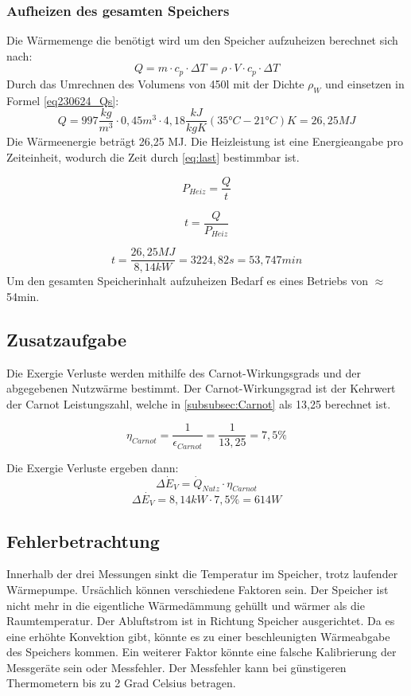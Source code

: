 \subsubsection{Aufheizen des gesamten Speichers}
Die Wärmemenge die benötigt wird um den Speicher aufzuheizen berechnet sich nach:
\begin{equation}
Q = m \cdot c_p \cdot \Delta T = \rho \cdot V \cdot c_p \cdot \Delta T
\label{eq230624_Qs}
\end{equation}
Durch das Umrechnen des Volumens von 450l mit der Dichte $\rho_W$ und einsetzen in Formel \ref{eq230624_Qs}:
$$ Q = 997 \frac{kg}{m^3} \cdot 0,45 m^3 \cdot 4,18 \frac{kJ}{kg K} (35 \text{°} C-21 \text{°} C)K=26,25 MJ$$
Die Wärmeenergie beträgt 26,25 MJ.
Die Heizleistung ist eine Energieangabe pro Zeiteinheit, wodurch die Zeit durch \autoref{eq:last} bestimmbar ist.

\begin{equation}
    P_{Heiz}= \frac{Q}{t}
    \label{eq:last}
\end{equation}

\begin{equation}
 t = \frac{Q}{P_{Heiz}}
\end{equation}

$$ t= \frac{26,25 MJ}{8,14 kW}=3224,82 s= 53,747 min$$
Um den gesamten Speicherinhalt aufzuheizen Bedarf es eines Betriebs von $\approx$ 54min.
\subsection{Zusatzaufgabe}

Die Exergie Verluste werden mithilfe des Carnot-Wirkungsgrads und der abgegebenen Nutzwärme bestimmt.
Der Carnot-Wirkungsgrad ist der Kehrwert der Carnot Leistungszahl, welche in \autoref{subsubsec:Carnot} als 13,25 berechnet ist.

\begin{equation}
    \eta_{Carnot}=\frac{1}{\epsilon_{Carnot}}=\frac{1}{13,25}= 7,5 \%
\end{equation}

Die Exergie Verluste ergeben dann:
\begin{equation}
   \Delta \dot{E}_V= \dot{Q}_{Nutz} \cdot\eta_{Carnot}
\end{equation}
$$\Delta \dot{E_V}= 8,14kW \cdot 7,5\%= 614W$$


\subsection{Fehlerbetrachtung}
Innerhalb der drei Messungen sinkt die Temperatur im Speicher,
trotz laufender Wärmepumpe. Ursächlich können verschiedene Faktoren sein. Der Speicher ist nicht mehr in die eigentliche Wärmedämmung gehüllt und wärmer als die Raumtemperatur. Der Abluftstrom ist in Richtung Speicher ausgerichtet. Da es eine erhöhte Konvektion gibt, könnte es zu einer beschleunigten Wärmeabgabe des Speichers kommen.
Ein weiterer Faktor könnte eine falsche Kalibrierung der Messgeräte sein oder Messfehler. Der Messfehler kann bei günstigeren Thermometern bis zu 2 Grad Celsius betragen.




